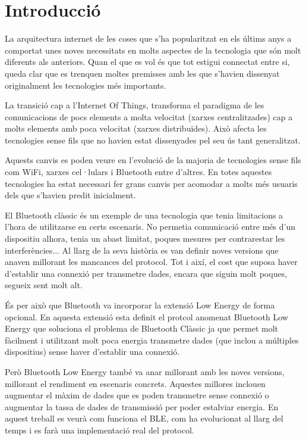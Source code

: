 \cleardoublepage
{}
\chapter*{Introducció}
La arquitectura internet de les coses que s'ha popularitzat en els últims anys a comportat unes noves necessitats en molts aspectes de la tecnologia que són molt diferents als anteriors.
Quan el que es vol és que tot estigui connectat entre si, queda clar que es trenquen moltes premisses amb les que s'havien dissenyat originalment les tecnologies més importants.

La transició cap a l'Internet Of Things, transforma el paradigma de les comunicacions de pocs elements a molta velocitat (xarxes centralitzades) cap a molts elements amb poca velocitat (xarxes distribuïdes).
Això afecta les tecnologies sense fils que no havien estat dissenyades pel seu ús tant generalitzat.

Aquests canvis es poden veure en l'evolució de la majoria de tecnologies sense fils com WiFi, xarxes cel·lulars i Bluetooth entre d'altres.
En totes aquestes tecnologies ha estat necessari fer grans canvis per acomodar a molts més usuaris dels que s'havien predit inicialment.

El Bluetooth clàssic és un exemple de una tecnologia que tenia limitacions a l'hora de utilitzarse en certs escenaris.
No permetia comunicació entre més d'un dispositiu alhora, tenia un abast limitat, poques mesures per contrarestar les interferències...
Al llarg de la seva història es van definir noves versions que anaven millorant les mancances del protocol.
Tot i així, el cost que suposa haver d'establir una connexió per transmetre dades, encara que siguin molt poques, segueix sent molt alt.

És per això que Bluetooth va incorporar la extensió Low Energy de forma opcional.
En aquesta extensió esta definit el protcol anomenat Bluetooth Low Energy que soluciona el problema de Bluetooth Clàssic ja que permet molt fàcilment i utilitzant molt poca energia transmetre dades (que inclou a múltiples dispositius) sense haver d'establir una connexió.

Però Bluetooth Low Energy també va anar millorant amb les noves versions, millorant el rendiment en escenaris concrets.
Aquestes millores inclouen augmentar el màxim de dades que es poden transmetre sense connexió o augmentar la tassa de dades de transmissió per poder estalviar energia.
En aquest treball es veurà com funciona el BLE, com ha evolucionat al llarg del temps i es farà una implementació real del protocol.